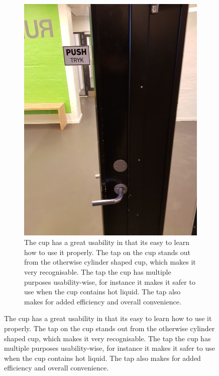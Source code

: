 \documentclass[11pt]{article}
\begin{document}
\begin{figure}[h]
\begin{subfigure}[t]{0.5\textwidth}
        \label{fig:cup}
    \end{subfigure}
    \begin{subfigure}[t]{0.5\textwidth}
        \includegraphics[scale=0.4]{InteraktionsDesign/Assets/door.jpg}
        \caption{The cup has a great usability in that its easy to learn how to use it properly. The tap on the cup stands out from the otherwise cylinder shaped cup, which makes it very recognisable. The tap the cup has multiple purposes usability-wise, for instance it makes it safer to use when the cup contains hot liquid. The tap also makes for added efficiency and overall convenience.}
        \label{fig:cup}
    \end{subfigure}
\end{figure}
\end{document}
